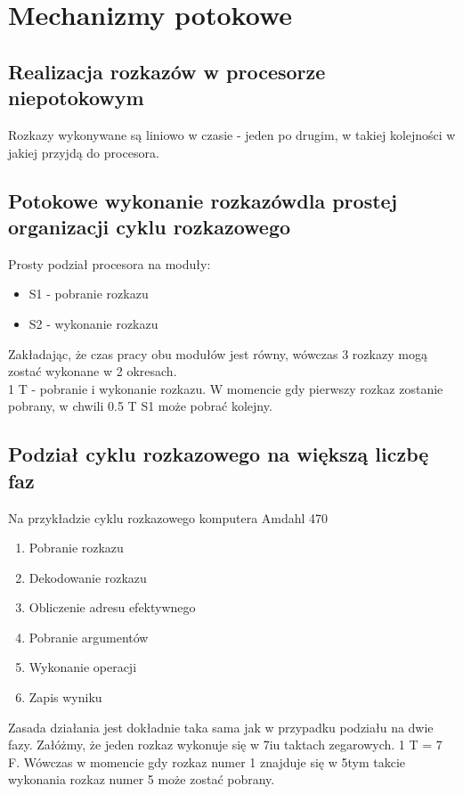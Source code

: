 	    
	\pagebreak
\section{Mechanizmy potokowe}
	\subsection{Realizacja rozkazów w procesorze niepotokowym}
		Rozkazy wykonywane są liniowo w czasie - jeden po drugim, w takiej kolejności w jakiej przyjdą do procesora.
   	\subsection{Potokowe wykonanie rozkazówdla prostej organizacji cyklu rozkazowego}
   		Prosty podział procesora na moduły:
	   	\begin{itemize}
	   		\item S1 - pobranie rozkazu
	   		\item S2 - wykonanie rozkazu
	   	\end{itemize}
   		Zakładając, że czas pracy obu modułów jest równy, wówczas 3 rozkazy mogą zostać wykonane w 2 okresach.\\
   		1 T - pobranie i wykonanie rozkazu. W momencie gdy pierwszy rozkaz zostanie pobrany, w chwili 0.5 T S1 może pobrać kolejny.
   	\subsection{Podział cyklu rozkazowego na większą liczbę faz}
   		Na przykładzie cyklu rozkazowego komputera Amdahl 470
	   	\begin{enumerate}
	   		\item Pobranie rozkazu
	   		\item Dekodowanie rozkazu
	   		\item Obliczenie adresu efektywnego
	   		\item Pobranie argumentów
	   		\item Wykonanie operacji
	   		\item Zapis wyniku
	   	\end{enumerate}
	   	Zasada działania jest dokładnie taka sama jak w przypadku podziału na dwie fazy. Załóżmy, że jeden rozkaz wykonuje się w 7iu taktach zegarowych. 1 T = 7 F. Wówczas w momencie gdy rozkaz numer 1 znajduje się w 5tym takcie wykonania rozkaz numer 5 może zostać pobrany.
   

